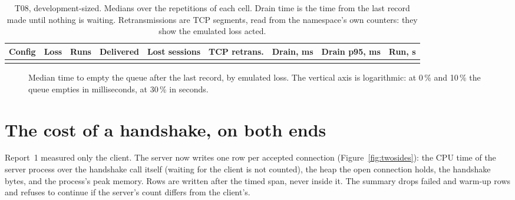 \documentclass[11pt,a4paper]{article}
\begin{document}
\begin{table}[!htbp]
\centering
\caption{T08, development-sized. Medians over the repetitions of each cell. Drain time is the time
from the last record made until nothing is waiting. Retransmissions are TCP segments, read from the
namespace's own counters: they show the emulated loss acted.}
\label{tab:loss}
\small
\begin{tabular}{@{}llrrrrrrr@{}}
\toprule
Config & Loss & Runs & Delivered & Lost sessions & TCP retrans. & Drain, ms & Drain p95, ms & Run, s \\
\midrule
\\
\bottomrule
\end{tabular}
\end{table}

\begin{figure}[!tbp]
\centering
{}
\caption{Median time to empty the queue after the last record, by emulated loss. The vertical axis is logarithmic: at 0\,\% and 10\,\% the queue empties in milliseconds, at 30\,\% in seconds.}
\label{fig:drain}
\end{figure}

\section{The cost of a handshake, on both ends}

Report~1 measured only the client. The server now writes one row per accepted connection
(Figure~\ref{fig:twosides}): the CPU time of the server process over the handshake call itself
(waiting for the client is not counted), the heap the open connection holds, the handshake bytes, and
the process's peak memory. Rows are written after the timed span, never inside it. The summary drops
failed and warm-up rows and refuses to continue if the server's count differs from the client's.
\end{document}
